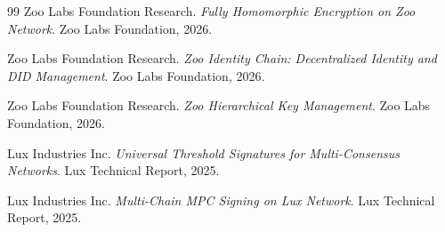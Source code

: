 \begin{thebibliography}{99}
Zoo Labs Foundation Research.
\textit{Fully Homomorphic Encryption on Zoo Network}.
Zoo Labs Foundation, 2026.

Zoo Labs Foundation Research.
\textit{Zoo Identity Chain: Decentralized Identity and DID Management}.
Zoo Labs Foundation, 2026.

Zoo Labs Foundation Research.
\textit{Zoo Hierarchical Key Management}.
Zoo Labs Foundation, 2026.

Lux Industries Inc.
\textit{Universal Threshold Signatures for Multi-Consensus Networks}.
Lux Technical Report, 2025.

Lux Industries Inc.
\textit{Multi-Chain MPC Signing on Lux Network}.
Lux Technical Report, 2025.

\end{thebibliography}

